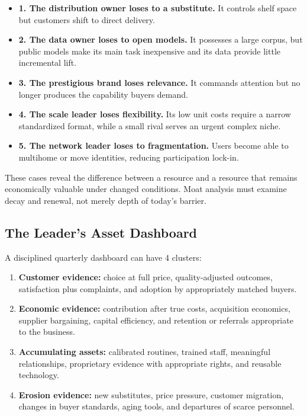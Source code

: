 \begin{itemize}
    \item \textbf{1. The distribution owner loses to a substitute.} It controls shelf space but customers shift to direct delivery.
    \item \textbf{2. The data owner loses to open models.} It possesses a large corpus, but public models make its main task inexpensive and its data provide little incremental lift.
    \item \textbf{3. The prestigious brand loses relevance.} It commands attention but no longer produces the capability buyers demand.
    \item \textbf{4. The scale leader loses flexibility.} Its low unit costs require a narrow standardized format, while a small rival serves an urgent complex niche.
    \item \textbf{5. The network leader loses to fragmentation.} Users become able to multihome or move identities, reducing participation lock-in.
\end{itemize}

These cases reveal the difference between a resource and a resource that remains economically valuable under changed conditions. Moat analysis must examine decay and renewal, not merely depth of today's barrier.

\subsection{The Leader's Asset Dashboard}
\label{sec:leaders_asset_dashboard}

A disciplined quarterly dashboard can have 4 clusters:
\begin{enumerate}
    \item \textbf{Customer evidence:} choice at full price, quality-adjusted outcomes, satisfaction plus complaints, and adoption by appropriately matched buyers.
    \item \textbf{Economic evidence:} contribution after true costs, acquisition economics, supplier bargaining, capital efficiency, and retention or referrals appropriate to the business.
    \item \textbf{Accumulating assets:} calibrated routines, trained staff, meaningful relationships, proprietary evidence with appropriate rights, and reusable technology.
    \item \textbf{Erosion evidence:} new substitutes, price pressure, customer migration, changes in buyer standards, aging tools, and departures of scarce personnel.
\end{enumerate}

